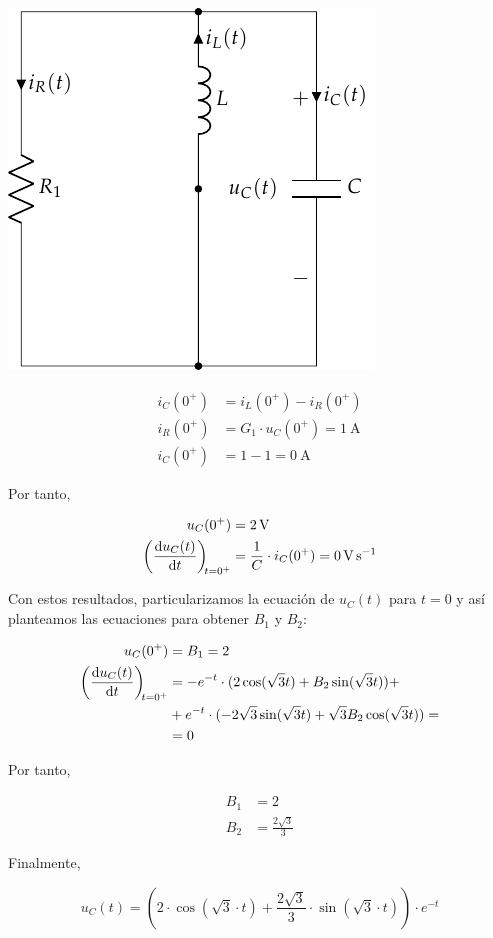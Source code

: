 \documentclass[12pt]{article}
\begin{document}
\begin{minipage}{0.3\textwidth}
  \includegraphics[scale=0.8]{figs/FM_4_9_natural}
\end{minipage}
\begin{minipage}{0.7\textwidth}
  \begin{align*}
    i_C(0^+) &= i_L(0^+) - i_R(0^+)\\
    i_R(0^+) &= G_1 \cdot u_C(0^+) = \SI{1}{\ampere}\\
    i_C(0^+) &= 1 - 1 = \SI{0}{\ampere}
  \end{align*}
\end{minipage}

\bigskip

Por tanto,

\begin{align*}
  u_C(0^+) &= \SI{2}{\volt}\\
  \diff{u_C(t)}{t}[t = 0^+] &= \frac{1}{C} \cdot i_C(0^+) = \SI{0}{\volt\per\second}
\end{align*}

Con estos resultados, particularizamos la ecuación de $u_C(t)$ para
$t = 0$ y así planteamos las ecuaciones para obtener $B_1$ y $B_2$:

\begin{align*}
  u_C(0^+) &= B_1 = 2\\
  \diff{u_C(t)}{t}[t = 0^+] &= -e^{-t} \cdot (2\cos(\sqrt{3}t) + B_2\sin(\sqrt{3}t)) +\\
           &+ e^{-t} \cdot (-2\sqrt{3}\sin(\sqrt{3}t) + \sqrt{3} B_2\cos(\sqrt{3}t)) =\\
           &= 0
\end{align*}

Por tanto,

\begin{align*}
  B_1 &= 2\\
  B_2 &= \frac{2\sqrt{3}}{3}
\end{align*}

Finalmente,

\begin{equation*}
  u_C(t) = (2 \cdot \cos(\sqrt{3} \cdot t) + \frac{2\sqrt{3}}{3} \cdot \sin(\sqrt{3} \cdot t)) \cdot e^{-t}
\end{equation*}


\clearpage
\end{document}
